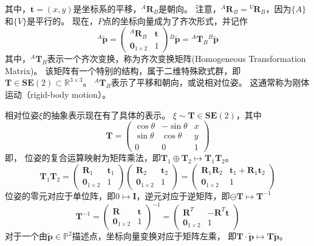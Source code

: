 \documentclass[UTF8,a4paper,10pt]{ctexart}
\begin{document}
其中，$\mathbf{t}=(x,y)$是坐标系的平移，${}^A\mathbf{R}_B$是朝向。
注意，${}^A\mathbf{R}_B={}^V\mathbf{R}_B$，因为$\{A\}$和$\{V\}$是平行的。
现在，$P$点的坐标向量成为了齐次形式，并记作
\begin{equation}
  {}^A\tilde{\mathbf{p}}=
  \begin{pmatrix}{}^A\mathbf{R}_B & \mathbf{t}\\\mathbf{0}_{1\times2}&1\end{pmatrix}
  {}^B\tilde{\mathbf{p}}={}^A\mathbf{T}_B{}^B\tilde{\mathbf{p}}
\end{equation}
其中，${}^A\mathbf{T}_B$表示一个齐次变换，称为齐次变换矩阵(Homogeneous Transformation Matrix)。
该矩阵有一个特别的结构，属于二维特殊欧式群，即$\mathbf{T}\in\mathbf{SE}(2)\subset\mathbb{R}^{3\times3}$。
${}^A\mathbf{T}_B$表示了平移和朝向，或说相对位姿。
这通常称为刚体运动（rigid-body motion）。

相对位姿$\xi$的抽象表示现在有了具体的表示。
$\xi\sim\mathbf{T}\in\mathbf{SE}(2)$，其中
$$
\mathbf{T}=\begin{pmatrix}\cos\theta&-\sin\theta&x\\\sin\theta&\cos\theta&y\\0&0&1\end{pmatrix}
$$
即，
位姿的复合运算映射为矩阵乘法，即$\mathbf{T}_1\oplus\mathbf{T}_2\mapsto\mathbf{T}_1\mathbf{T}_2$。
$$
\mathbf{T}_1\mathbf{T}_2
=\begin{pmatrix}\mathbf{R}_1&\mathbf{t}_1\\\mathbf{0}_{1\times2}&1\end{pmatrix}
\begin{pmatrix}\mathbf{R}_2&\mathbf{t}_2\\\mathbf{0}_{1\times2}&1\end{pmatrix}
=\begin{pmatrix}\mathbf{R}_1\mathbf{R}_2&\mathbf{t}_1+\mathbf{R}_1\mathbf{t}_2\\\mathbf{0}_{1\times2}&1\end{pmatrix}
$$
位姿的零元对应于单位阵，即$0\mapsto\mathbf{I}$，逆元对应于逆矩阵，即$\ominus\mathbf{T}\mapsto\mathbf{T}^{-1}$
$$
\mathbf{T}^{-1}
=\begin{pmatrix}\mathbf{R}&\mathbf{t}\\\mathbf{0}_{1\times2}&1\end{pmatrix}^{-1}
=\begin{pmatrix}\mathbf{R}^T&-\mathbf{R}^T\mathbf{t}\\\mathbf{0}_{1\times2}&1\end{pmatrix}
$$
对于一个由$\tilde{\mathbf{p}}\in\mathbb{P}^2$描述点，坐标向量变换对应于矩阵左乘，
即$\mathbf{T}\cdot\tilde{\mathbf{p}}\mapsto\mathbf{T}\tilde{\mathbf{p}}$。
\end{document}
